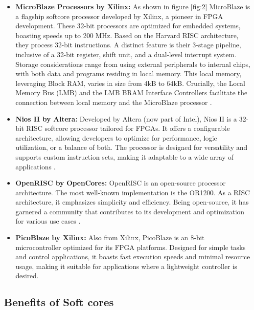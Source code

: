 \documentclass[conference]{IEEEtran}
\begin{document}
\begin{itemize}
    \item \textbf{MicroBlaze Processors by Xilinx:} As shown in figure \ref{fig:2} MicroBlaze is a flagship softcore processor developed by Xilinx, a pioneer in FPGA development. These 32-bit processors are optimized for embedded systems, boasting speeds up to 200 MHz. Based on the Harvard RISC architecture, they process 32-bit instructions. A distinct feature is their 3-stage pipeline, inclusive of a 32-bit register, shift unit, and a dual-level interrupt system. Storage considerations range from using external peripherals to internal chips, with both data and programs residing in local memory. This local memory, leveraging Block RAM, varies in size from 4kB to 64kB. Crucially, the Local Memory Bus (LMB) and the LMB BRAM Interface Controllers facilitate the connection between local memory and the MicroBlaze processor \cite{4}.
  
    \item \textbf{Nios II by Altera:} Developed by Altera (now part of Intel), Nios II is a 32-bit RISC softcore processor tailored for FPGAs. It offers a configurable architecture, allowing developers to optimize for performance, logic utilization, or a balance of both. The processor is designed for versatility and supports custom instruction sets, making it adaptable to a wide array of applications \cite{2}.
    
    \item \textbf{OpenRISC by OpenCores:} OpenRISC is an open-source processor architecture. The most well-known implementation is the OR1200. As a RISC architecture, it emphasizes simplicity and efficiency. Being open-source, it has garnered a community that contributes to its development and optimization for various use cases \cite{2}.
    
    \item \textbf{PicoBlaze by Xilinx:} Also from Xilinx, PicoBlaze is an 8-bit microcontroller optimized for its FPGA platforms. Designed for simple tasks and control applications, it boasts fast execution speeds and minimal resource usage, making it suitable for applications where a lightweight controller is desired.
\end{itemize}

\subsection{Benefits of Soft cores}
\end{document}
